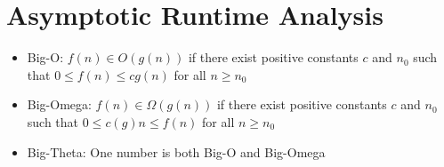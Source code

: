\section{Asymptotic Runtime Analysis}

\begin{itemize}
  \item Big-O: $f(n) \in O(g(n))$ if there exist positive constants $c$ and $n_0$ such that $0 \leq f(n) \leq cg(n)$ for all $n \geq n_0$
  \item Big-Omega: $f(n) \in \Omega(g(n))$ if there exist positive constants $c$ and $n_0$ such that $0 \leq c(g)n \leq f(n)$ for all $n \geq n_0$
  \item Big-Theta: One number is both Big-O and Big-Omega
\end{itemize}

